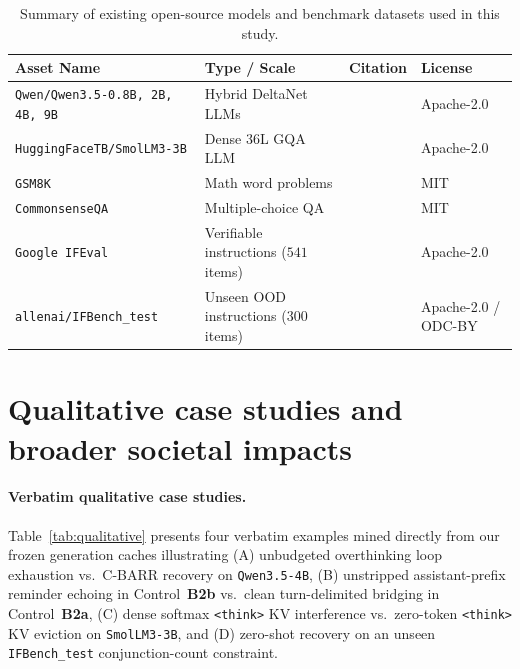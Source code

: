 \documentclass{article}
\begin{document}
\begin{table}[h]
\centering
\caption{Summary of existing open-source models and benchmark datasets used in this study.}
\label{tab:asset_licenses}
\small
\begin{tabular}{llll}
\toprule
\textbf{Asset Name} & \textbf{Type / Scale} & \textbf{Citation} & \textbf{License} \\
\midrule
\texttt{Qwen/Qwen3.5-0.8B, 2B, 4B, 9B} & Hybrid DeltaNet LLMs & \citet{yang2025qwen3,yang2024gateddeltanet} & Apache-2.0 \\
\texttt{HuggingFaceTB/SmolLM3-3B} & Dense 36L GQA LLM & \citet{benallal2025smollm3} & Apache-2.0 \\
\texttt{GSM8K} & Math word problems & \citet{cobbe2021gsm8k} & MIT \\
\texttt{CommonsenseQA} & Multiple-choice QA & \citet{talmor2019commonsenseqa} & MIT \\
\texttt{Google IFEval} & Verifiable instructions ($541$ items) & \citet{zhou2023ifeval} & Apache-2.0 \\
\texttt{allenai/IFBench\_test} & Unseen OOD instructions ($300$ items) & \citet{pyatkin2025ifbench} & Apache-2.0 / ODC-BY \\
\bottomrule
\end{tabular}
\end{table}

\section{Qualitative case studies and broader societal impacts}
\label{app:qualitative_impacts}

\paragraph{Verbatim qualitative case studies.}
Table~\ref{tab:qualitative} presents four verbatim examples mined directly from our frozen generation caches illustrating (A) unbudgeted overthinking loop exhaustion vs.\ C-BARR recovery on \texttt{Qwen3.5-4B}, (B) unstripped assistant-prefix reminder echoing in Control~\textbf{B2b} vs.\ clean turn-delimited bridging in Control~\textbf{B2a}, (C) dense softmax \texttt{<think>} KV interference vs.\ zero-token \texttt{<think>} KV eviction on \texttt{SmolLM3-3B}, and (D) zero-shot recovery on an unseen \texttt{IFBench\_test} conjunction-count constraint.
\end{document}
